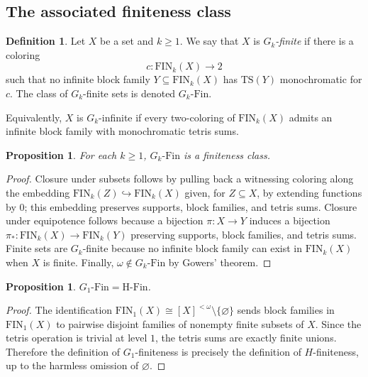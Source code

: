\documentclass[10pt,a4paper]{amsart}
\newtheorem{proposition}[theorem]{Proposition}
\theoremstyle{definition}
\newtheorem{definition}[theorem]{Definition}
\newcommand{\Fin}{\mathrm{Fin}}
\newcommand{\HFin}{\mathrm{H\text{-}Fin}}
\newcommand{\FIN}{\mathrm{FIN}}
\newcommand{\TS}{\mathrm{TS}}
\begin{document}
\subsection{The associated finiteness class}

\begin{definition}
Let \(X\) be a set and \(k\geq 1\).  We say that \(X\) is \emph{\(G_k\)-finite} if there is a coloring
\[
    c:\FIN_k(X)\to 2
\]
such that no infinite block family \(Y\subseteq\FIN_k(X)\) has \(\TS(Y)\) monochromatic for \(c\).  The class of \(G_k\)-finite sets is denoted \(G_k\text{-}\Fin\).
\end{definition}

Equivalently, \(X\) is \(G_k\)-infinite if every two-coloring of \(\FIN_k(X)\) admits an infinite block family with monochromatic tetris sums.

\begin{proposition}
For each \(k\geq 1\), \(G_k\text{-}\Fin\) is a finiteness class.
\end{proposition}

\begin{proof}
Closure under subsets follows by pulling back a witnessing coloring along the embedding \(\FIN_k(Z)\hookrightarrow\FIN_k(X)\) given, for \(Z\subseteq X\), by extending functions by \(0\); this embedding preserves supports, block families, and tetris sums.  Closure under equipotence follows because a bijection \(\pi:X\to Y\) induces a bijection \(\pi_*:\FIN_k(X)\to\FIN_k(Y)\) preserving supports, block families, and tetris sums.  Finite sets are \(G_k\)-finite because no infinite block family can exist in \(\FIN_k(X)\) when \(X\) is finite.  Finally, \(\omega\notin G_k\text{-}\Fin\) by Gowers' theorem.
\end{proof}

\begin{proposition}
\(G_1\text{-}\Fin=\HFin\).
\end{proposition}

\begin{proof}
The identification \(\FIN_1(X)\cong [X]^{<\omega}\setminus\{\varnothing\}\) sends block families in \(\FIN_1(X)\) to pairwise disjoint families of nonempty finite subsets of \(X\).  Since the tetris operation is trivial at level \(1\), the tetris sums are exactly finite unions.  Therefore the definition of \(G_1\)-finiteness is precisely the definition of \(H\)-finiteness, up to the harmless omission of \(\varnothing\).
\end{proof}
\end{document}
